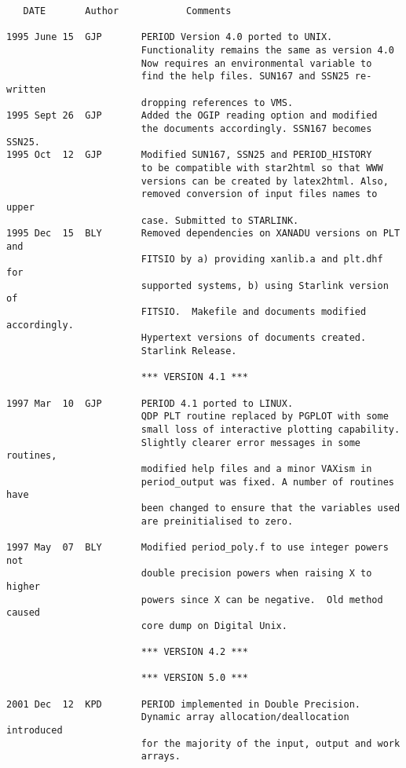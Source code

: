 \newpage


\begin{verbatim}
   DATE       Author            Comments

1995 June 15  GJP       PERIOD Version 4.0 ported to UNIX.
                        Functionality remains the same as version 4.0
                        Now requires an environmental variable to
                        find the help files. SUN167 and SSN25 re-written
                        dropping references to VMS.
1995 Sept 26  GJP       Added the OGIP reading option and modified
                        the documents accordingly. SSN167 becomes SSN25.
1995 Oct  12  GJP       Modified SUN167, SSN25 and PERIOD_HISTORY
                        to be compatible with star2html so that WWW
                        versions can be created by latex2html. Also,
                        removed conversion of input files names to upper
                        case. Submitted to STARLINK.
1995 Dec  15  BLY       Removed dependencies on XANADU versions on PLT and
                        FITSIO by a) providing xanlib.a and plt.dhf for
                        supported systems, b) using Starlink version of
                        FITSIO.  Makefile and documents modified accordingly.
                        Hypertext versions of documents created.
                        Starlink Release.

                        *** VERSION 4.1 ***

1997 Mar  10  GJP       PERIOD 4.1 ported to LINUX.
                        QDP PLT routine replaced by PGPLOT with some
                        small loss of interactive plotting capability.
                        Slightly clearer error messages in some routines,
                        modified help files and a minor VAXism in
                        period_output was fixed. A number of routines have
                        been changed to ensure that the variables used
                        are preinitialised to zero.

1997 May  07  BLY       Modified period_poly.f to use integer powers not
                        double precision powers when raising X to higher
                        powers since X can be negative.  Old method caused
                        core dump on Digital Unix.

                        *** VERSION 4.2 ***

                        *** VERSION 5.0 ***

2001 Dec  12  KPD       PERIOD implemented in Double Precision.
                        Dynamic array allocation/deallocation introduced
                        for the majority of the input, output and work
                        arrays.


\end{verbatim}


